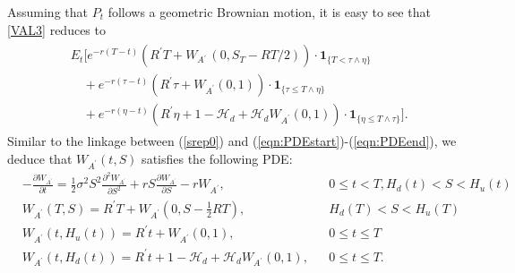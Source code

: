 \documentclass[11pt]{article}%
\numberwithin{equation}{section}
\theoremstyle{plain}
\newcommand{\Ap}{A\ensuremath{^\prime}~}
\begin{document}
Assuming that $P_t$ follows a geometric Brownian motion, it is easy to see that \eqref{VAL3} reduces to
\begin{align*}
\begin{split} ~& E_{t}\Bigg[e^{-r(T-t)}(R^\prime T+W_{\Ap}(0,S_T-RT/2))\cdot\mathbf{1}_{\{T<\tau\land\eta\}}\\
&\quad+e^{-r(\tau-t)}(R^\prime\tau+W_{A^\prime}(0,1))\cdot\mathbf{1}_{\{\tau\le T\land\eta\}}\\
 & \quad+e^{-r(\eta-t)}\left(R^\prime\eta+1-\mathcal{H}_d+\mathcal{H}_d W_{A^\prime}(0,1)\right)\cdot\mathbf{1}_{\{\eta\le T\land\tau\}}\Bigg].
\end{split}
\end{align*}
Similar to the linkage between (\ref{srep0}) and (\ref{eqn:PDEstart})-(\ref{eqn:PDEend}), we deduce that $W_{A^\prime}(t,S)$ satisfies the following PDE:
\begin{align*}
&-\frac{\partial W_{A^\prime}}{\partial t}  =\frac{1}{2}\sigma^{2}S^{2}\frac{\partial^{2}W_{A^\prime}}{\partial S^{2}}
   +r S\frac{\partial W_{A^\prime}}{\partial S}-r W_{A^\prime}, &&0\le t<T, H_d(t)<S<H_u(t)\\
&W_{A^\prime}(T,S)  =R^\prime T+W_{A^\prime}(0,S-\frac{1}{2}RT),&&H_d(T)<S<H_u(T)\\
&W_{A^\prime}(t,H_{u}(t))  =R^\prime t+W_{A^\prime}(0,1),&&0\le t\le T\\
&W_{A^\prime}(t,H_d(t))  =R^\prime t+1-\mathcal{H}_{d}+\mathcal{H}_{d}W_{A^\prime}(0,1),&&0\le t\le T.
\end{align*}



\end{document}
